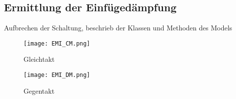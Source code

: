 \subsection{Ermittlung der Einfügedämpfung} \label{subsec:ermittlung}
Aufbrechen der Schaltung, beschrieb der Klassen und Methoden des Models

\begin{figure}[H]
		\centering
		\texttt{[image: EMI\_CM.png]}
		\label{fig:cmschaltung}
		\caption{Gleichtakt}
\end{figure}

\begin{figure}[H]
		\centering
		\texttt{[image: EMI\_DM.png]}
		\label{fig:dmschaltung}
		\caption{Gegentakt}
\end{figure}

